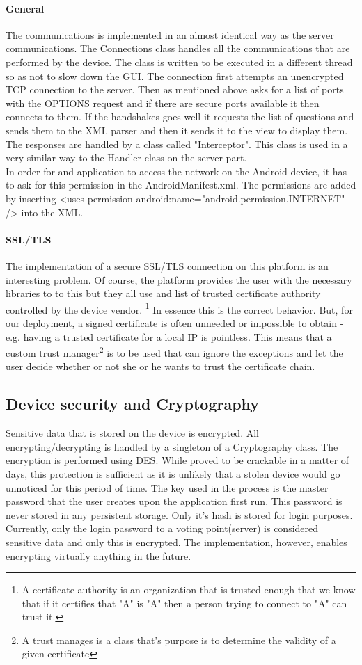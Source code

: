 \documentclass[11pt,twoside,a4paper]{book}
\begin{document}
\paragraph{General}The communications is implemented in an almost identical way as the server communications. The Connections class handles all the communications that are performed by the device. The class is written to be executed in a different thread so as not to slow down the GUI. The connection first attempts an unencrypted TCP connection to the server. Then as mentioned above asks for a list of ports with the OPTIONS request and if there are secure ports available it then connects to them. If the handshakes goes well it requests the list of questions and sends them to the XML parser and then it sends it to the view to display them. The responses are handled by a class called "Interceptor". This class is used in a very similar way to the Handler class on the server part.\\
In order for and application to access the network on the Android device, it has to ask for this permission in the AndroidManifest.xml. The permissions are added by inserting <uses-permission android:name="android.permission.INTERNET" /> into the XML.
\paragraph{SSL/TLS}
The implementation of a secure SSL/TLS connection on this platform is an interesting problem. Of course, the platform provides the user with the necessary libraries to to this but they all use and  list of trusted certificate authority controlled by the device vendor. \footnote{A certificate authority is an organization that is trusted enough that we know that if it certifies that "A" is "A" then a person trying to connect to "A" can trust it.} In essence this is the correct behavior. But, for our deployment, a signed certificate is often unneeded or impossible to obtain - e.g. having a trusted certificate for a local IP is pointless. This means that a custom trust manager\footnote{A trust manages is a class that's purpose is to determine the validity of a given certificate}  is to be used that can ignore the exceptions and let the user decide whether or not she or he wants to trust the certificate chain.
\subsection{Device security and Cryptography}
Sensitive data that is stored on the device is encrypted. All encrypting/decrypting is handled by a singleton of a Cryptography class. The encryption is performed using DES\cite{des}. While proved to be crackable in a matter of days, this protection is sufficient as it is unlikely that a stolen device would go unnoticed for this period of time.  The key used in the process is the master password that the user creates upon the application first run. This password is never stored in any persistent storage. Only it's hash is stored for login purposes.	 Currently, only the login password to a voting point(server)  is considered sensitive data and only this is encrypted. The implementation, however, enables encrypting virtually anything in the future.
\end{document}
